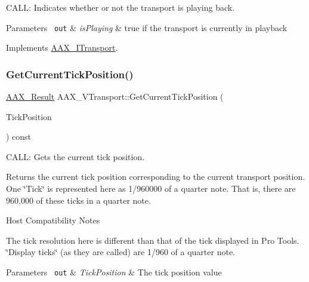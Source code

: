C\+A\+LL\+: Indicates whether or not the transport is playing back. 


\begin{DoxyParams}[1]{Parameters}
\mbox{\texttt{ out}}  & {\em is\+Playing} & {\ttfamily true} if the transport is currently in playback \\
\hline
\end{DoxyParams}


Implements \mbox{\hyperlink{a01885_a8f7d5b8f65ff9dd456a395838c974715}{A\+A\+X\+\_\+\+I\+Transport}}.

\mbox{\label{a01941_a1e46d5b0d2c1809ca4bd185703e64091}} 
\subsubsection{\texorpdfstring{GetCurrentTickPosition()}{GetCurrentTickPosition()}}
{\footnotesize\ttfamily \mbox{\hyperlink{a00392_a4d8f69a697df7f70c3a8e9b8ee130d2f}{A\+A\+X\+\_\+\+Result}} A\+A\+X\+\_\+\+V\+Transport\+::\+Get\+Current\+Tick\+Position (\begin{DoxyParamCaption}\item[{int64\+\_\+t $\ast$}]{Tick\+Position }\end{DoxyParamCaption}) const\hspace{0.3cm}{\ttfamily [virtual]}}



C\+A\+LL\+: Gets the current tick position. 

Returns the current tick position corresponding to the current transport position. One \char`\"{}\+Tick\char`\"{} is represented here as 1/960000 of a quarter note. That is, there are 960,000 of these ticks in a quarter note.

\begin{DoxyRefDesc}{Host Compatibility Notes}
\item[\mbox{\hyperlink{a00786__compatibility_notes000060}{Host Compatibility Notes}}]The tick resolution here is different than that of the tick displayed in Pro Tools. \char`\"{}\+Display ticks\char`\"{} (as they are called) are 1/960 of a quarter note.\end{DoxyRefDesc}



\begin{DoxyParams}[1]{Parameters}
\mbox{\texttt{ out}}  & {\em Tick\+Position} & The tick position value \\
\hline
\end{DoxyParams}


